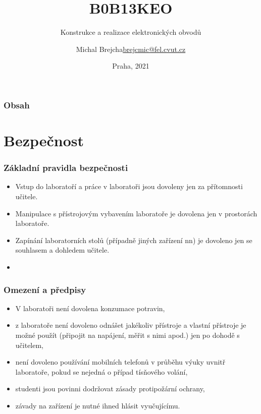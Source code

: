 \documentclass{beamer}
\title[B0B13KEO]{B0B13KEO}
\subtitle[KEO] {Konstrukce a realizace elektronických obvodů}
\author[Brejcha]{\texorpdfstring{Michal Brejcha\newline\url{brejcmic@fel.cvut.cz}}{Michal Brejcha}}
\institute[CVUT]{ČVUT v Praze, FEL}
\date[Praha, 2021]{Praha, 2021}
\begin{document}
\frame{\titlepage}

\begin{frame}
\frametitle{Obsah} 
\tableofcontents
\end{frame}


\section{\texorpdfstring{Bezpečnost}{Bezpecnost}}
	\begin{frame}
    \frametitle{Základní pravidla bezpečnosti}
		\begin{itemize}
		\item Vstup do laboratoří a práce v laboratoři jsou dovoleny jen za přítomnosti učitele.
		\item Manipulace s přístrojovým vybavením laboratoře je dovolena jen v prostorách laboratoře.
		\item Zapínání laboratorních stolů (případně jiných zařízení nn) je dovoleno jen se souhlasem a dohledem učitele.
		\item \textbf{}
		\end{itemize}
	\end{frame}
	\begin{frame}
    \frametitle{Omezení a předpisy}
		\begin{itemize}
		\item V laboratoři není dovolena konzumace potravin,
    \item z laboratoře není dovoleno odnášet jakékoliv přístroje a vlastní přístroje je možné použít (připojit na napájení, měřit s nimi apod.) jen po dohodě s učitelem,
		\item není dovoleno používání mobilních telefonů v průběhu výuky uvnitř laboratoře, pokud se nejedná o případ tísňového volání,
		\item studenti jsou povinni dodržovat zásady protipožární ochrany,
		\item závady na zařízení je nutné ihned hlásit vyučujícímu.
		\end{itemize}
	\end{frame}
\end{document}
